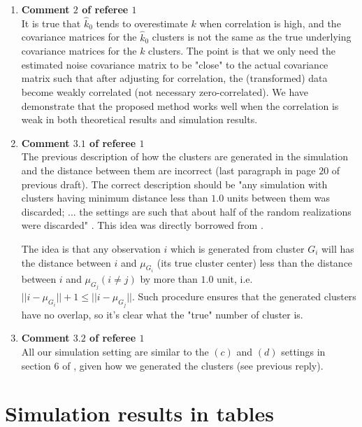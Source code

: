 \documentclass[11pt]{article}
\begin{document}
\begin{enumerate}
	\item \textbf{Comment $2$ of referee $1$} \\
	It is true that $\hat{k}_0$ tends to overestimate $k$ when correlation is high, and the covariance matrices for the  $\hat{k}_0$ clusters is not the same as the true underlying covariance matrices for the $k$ clusters. The point is that we only need the estimated noise covariance matrix to be "close" to the actual covariance matrix such that after adjusting for correlation, the (transformed) data become weakly correlated (not necessary zero-correlated). We have demonstrate that the proposed method works well when the correlation is weak in both theoretical results and simulation results.
	\item \textbf{Comment $3.1$ of referee $1$} \\
    The previous description of how the clusters are generated in the simulation and the distance between them are incorrect (last paragraph in page $20$ of previous draft). The correct description should be "any simulation with clusters having minimum distance less than $1.0$ units between them was discarded; ... the settings are such that about half of the random realizations were discarded"
\cite{tibshirani2001estimating}. This idea was directly borrowed from \cite{tibshirani2001estimating}. 

The idea is that any observation $i$ which is generated from cluster $G_i$ will has the distance between $i$ and $\mu_{G_i}$ (its true cluster center) less than the distance between $i$ and $\mu_{G_j} (i\neq j)$ by more than $1.0$ unit, i.e. $||i - \mu_{G_i}|| + 1 \leq ||i - \mu_{G_j}||$. Such procedure ensures that the generated clusters have no overlap, so it's clear what the "true" number of cluster is. 
	\item \textbf{Comment $3.2$ of referee $1$} \\
	All our simulation setting are similar to the $(c)$ and $(d)$ settings in section $6$ of \cite{tibshirani2001estimating}, given how we generated the clusters (see previous reply). 
\end{enumerate}

\section{Simulation results in tables}
\end{document}
